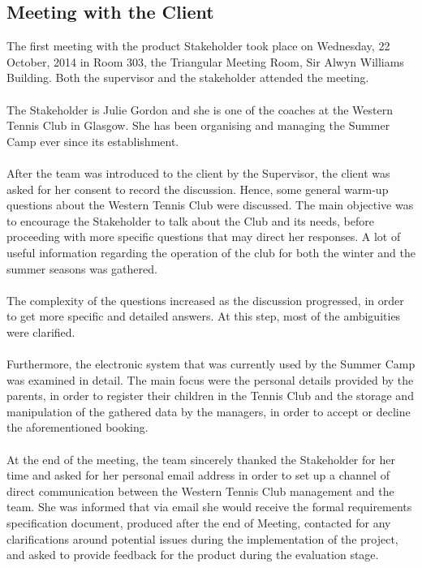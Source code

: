 \documentclass{l3proj}
\begin{document}
\subsection{Meeting with the Client}
\par
The first meeting with the product Stakeholder took place on Wednesday, 22 October, 2014 in Room 303, the Triangular Meeting Room, Sir Alwyn Williams Building. Both the supervisor and the stakeholder attended the meeting.\\
\\
The Stakeholder is Julie Gordon and she is one of the coaches at the Western Tennis Club in Glasgow. She has been organising and managing the Summer Camp ever since its establishment.\\
\\
After the team was introduced to the client by the Supervisor, the client was asked for her consent to record the discussion. Hence,  some general warm-up questions about the Western Tennis Club were discussed. The main objective was to encourage the Stakeholder to talk about the Club and its needs, before proceeding with more specific questions that may direct her responses. A lot of useful information regarding the operation of the club for both the winter and the summer seasons was gathered.\\
\\
The complexity of the questions increased as the discussion progressed, in order to get more specific and detailed answers. At this step, most of the ambiguities were clarified.\\
\\
Furthermore,  the electronic system that was currently used by the Summer Camp was examined in detail. The main focus were the personal details provided by the parents, in order to register their children in the Tennis Club and the storage and manipulation of the gathered data by the managers, in order to accept or decline the aforementioned booking.\\
\\
At the end of the meeting, the team sincerely thanked the Stakeholder for her time and asked for her personal email address in order to set up a channel of direct communication between the Western Tennis Club management and the team. She was informed that via email she would receive the formal requirements specification document, produced after the end of Meeting, contacted for any clarifications around potential issues during the implementation of the project, and  asked to provide feedback for the product during the evaluation stage.
\end{document}
